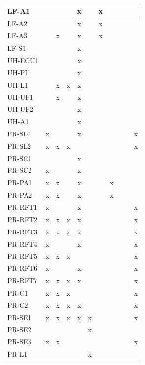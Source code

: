 \documentclass[12pt]{article}
\begin{document}
\begin{longtable}{|l|*{5}{c|}*{5}{c|}}
  LF-A1 &  &  &  & x &  & x &  &  &  &  \\ \hline
  LF-A2 &  &  &  & x &  & x &  &  &  &  \\ \hline
  LF-A3 &  & x &  & x &  & x &  &  &  &  \\ \hline
  LF-S1 &  &  &  & x &  &  &  &  &  &  \\ \hline
  
  UH-EOU1 &  &  &  & x &  &  &  &  &  &  \\ \hline
  UH-PI1  &  &  &  & x &  &  &  &  &  &  \\ \hline
  UH-L1   &  & x & x & x &  &  &  &  &  &  \\ \hline
  UH-UP1  &  & x &  & x &  &  &  &  &  &  \\ \hline
  UH-UP2  &  &  &  & x &  &  &  &  &  &  \\ \hline
  UH-A1   &  &  &  & x &  &  &  &  &  &  \\ \hline
  
  PR-SL1  & x &  &  & x &  &  &  &  &  & x \\ \hline
  PR-SL2  & x & x & x &  &  &  &  &  &  & x \\ \hline
  PR-SC1  &  &  &  & x &  &  &  &  &  &  \\ \hline
  PR-SC2  & x &  &  & x &  &  &  &  &  &  \\ \hline
  PR-PA1  & x & x &  & x &  &  & x &  &  &  \\ \hline
  PR-PA2  & x & x &  & x &  &  & x &  &  &  \\ \hline
  PR-RFT1 & x &  &  & x &  &  &  &  &  & x \\ \hline
  PR-RFT2 & x & x & x & x &  &  &  &  &  & x \\ \hline
  PR-RFT3 & x & x & x & x &  &  &  &  &  & x \\ \hline
  PR-RFT4 & x &  &  & x &  &  &  &  &  & x \\ \hline
  PR-RFT5 & x & x & x &  &  &  &  &  &  & x \\ \hline
  PR-RFT6 & x &  &  & x &  &  &  &  &  & x \\ \hline
  PR-RFT7 & x & x & x & x &  &  &  &  &  & x \\ \hline
  PR-C1   & x & x & x &  &  &  &  &  &  & x \\ \hline
  PR-C2   & x & x & x & x &  &  &  &  &  & x \\ \hline
  PR-SE1  & x & x & x & x & x &  &  &  &  & x \\ \hline
  PR-SE2  &  &  &  &  & x &  &  &  &  &  \\ \hline
  PR-SE3  & x & x &  &  &  &  &  &  &  & x \\ \hline
  PR-L1   &  &  &  &  & x &  &  &  &  &  \\ \hline
  

\end{longtable}
\end{document}
